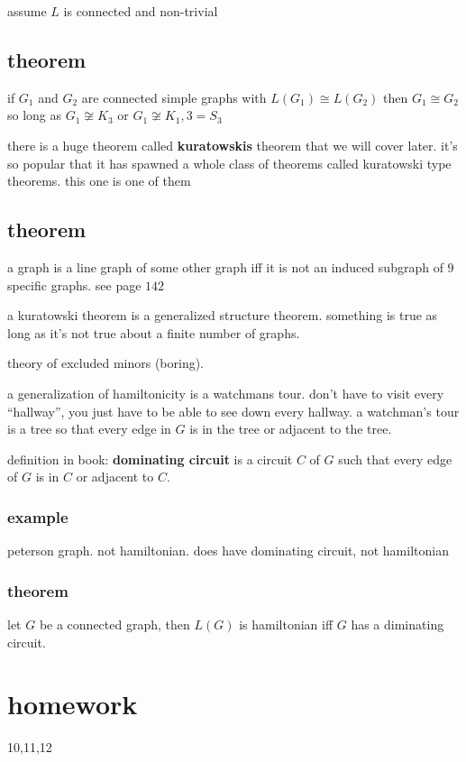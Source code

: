 \documentclass[letterpaper]{article}
\begin{document}
assume $L$ is connected and non-trivial

\subsection*{theorem}
if $G_1$ and $G_2$ are connected simple graphs with $L(G_1)\cong L(G_2)$ then $G_1\cong G_2$ so long as $G_1\not\cong K_3$ or $G_1\not\cong K_1,3=S_3$

there is a huge theorem called {\bfseries kuratowskis} theorem that we will cover later. it's so popular that it has spawned a whole class of theorems called kuratowski type theorems. this one is one of them
\subsection*{theorem}
a graph is a line graph of some other graph iff it is not an induced subgraph of $9$ specific graphs. see page $142$

a kuratowski theorem is a generalized structure theorem.  something is true as long as it's not true about a finite number of graphs.

theory of excluded minors (boring).

a generalization of hamiltonicity is a watchmans tour. don't have to visit every ``hallway'', you just have to be able to see down every hallway. a watchman's tour is a tree so that every edge in $G$ is in the tree or adjacent to the tree.

definition in book:
{\bfseries dominating circuit} is a circuit $C$ of $G$ such that every edge of $G$ is in $C$ or adjacent to $C$.

\subsubsection*{example}
peterson graph. not hamiltonian. does have dominating circuit, not hamiltonian

\subsubsection*{theorem}
let $G$ be a connected graph, then $L(G)$ is hamiltonian iff $G$ has a diminating circuit.

\section*{homework}
10,11,12
\end{document}
